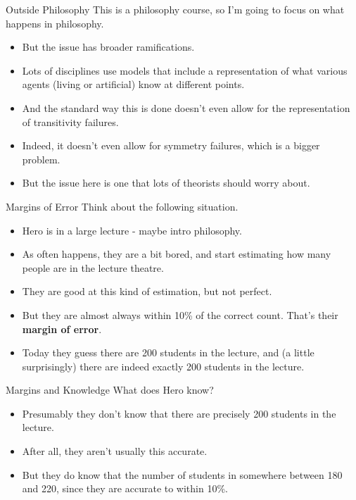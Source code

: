 \documentclass[
  14pt,
  letterpaper,
  ignorenonframetext,
]{beamer}
\providecommand{\tightlist}{%
  \setlength{\itemsep}{0pt}\setlength{\parskip}{0pt}}\usepackage{longtable,booktabs,array}
\begin{document}
\begin{frame}{Outside Philosophy}
\protect\hypertarget{outside-philosophy}{}
This is a philosophy course, so I'm going to focus on what happens in
philosophy.

\begin{itemize}
\tightlist
\item
  But the issue has broader ramifications.
\item
  Lots of disciplines use models that include a representation of what
  various agents (living or artificial) know at different points.
\item
  And the standard way this is done doesn't even allow for the
  representation of transitivity failures.
\item
  Indeed, it doesn't even allow for symmetry failures, which is a bigger
  problem.
\item
  But the issue here is one that lots of theorists should worry about.
\end{itemize}
\end{frame}

\begin{frame}{Margins of Error}
\protect\hypertarget{margins-of-error}{}
Think about the following situation.

\begin{itemize}
\tightlist
\item
  Hero is in a large lecture - maybe intro philosophy.
\item
  As often happens, they are a bit bored, and start estimating how many
  people are in the lecture theatre.
\item
  They are good at this kind of estimation, but not perfect.
\item
  But they are almost always within 10\% of the correct count. That's
  their \textbf{margin of error}.
\item
  Today they guess there are 200 students in the lecture, and (a little
  surprisingly) there are indeed exactly 200 students in the lecture.
\end{itemize}
\end{frame}

\begin{frame}{Margins and Knowledge}
\protect\hypertarget{margins-and-knowledge}{}
What does Hero know?

\begin{itemize}
\tightlist
\item
  Presumably they don't know that there are precisely 200 students in
  the lecture.
\item
  After all, they aren't usually this accurate.
\item
  But they do know that the number of students in somewhere between 180
  and 220, since they are accurate to within 10\%.
\end{itemize}
\end{frame}
\end{document}
